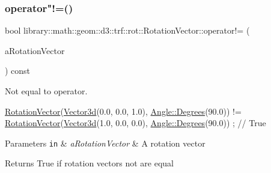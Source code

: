 \subsubsection{\texorpdfstring{operator"!=()}{operator!=()}}
{\footnotesize\ttfamily bool library\+::math\+::geom\+::d3\+::trf\+::rot\+::\+Rotation\+Vector\+::operator!= (\begin{DoxyParamCaption}\item[{const \hyperlink{classlibrary_1_1math_1_1geom_1_1d3_1_1trf_1_1rot_1_1_rotation_vector}{Rotation\+Vector} \&}]{a\+Rotation\+Vector }\end{DoxyParamCaption}) const}



Not equal to operator. 


\begin{DoxyCode}
\hyperlink{classlibrary_1_1math_1_1geom_1_1d3_1_1trf_1_1rot_1_1_rotation_vector_a49076a279f457fdb14c4a9d4d61e1738}{RotationVector}(\hyperlink{namespacelibrary_1_1math_1_1obj_a977e84e9bf317a4e7dd9d6d671d6da2f}{Vector3d}(0.0, 0.0, 1.0), \hyperlink{classlibrary_1_1math_1_1geom_1_1_angle_a64aa53e8420aeb6f671d86c65c370bc8}{Angle::Degrees}(90.0)) != 
      \hyperlink{classlibrary_1_1math_1_1geom_1_1d3_1_1trf_1_1rot_1_1_rotation_vector_a49076a279f457fdb14c4a9d4d61e1738}{RotationVector}(\hyperlink{namespacelibrary_1_1math_1_1obj_a977e84e9bf317a4e7dd9d6d671d6da2f}{Vector3d}(1.0, 0.0, 0.0), \hyperlink{classlibrary_1_1math_1_1geom_1_1_angle_a64aa53e8420aeb6f671d86c65c370bc8}{Angle::Degrees}(90.0)) ; \textcolor{comment}{// True}
\end{DoxyCode}



\begin{DoxyParams}[1]{Parameters}
\mbox{\tt in}  & {\em a\+Rotation\+Vector} & A rotation vector \\
\hline
\end{DoxyParams}
\begin{DoxyReturn}{Returns}
True if rotation vectors not are equal 
\end{DoxyReturn}
\mbox{\label{classlibrary_1_1math_1_1geom_1_1d3_1_1trf_1_1rot_1_1_rotation_vector_a3e56f843ce247d75d93a99defa47b386}} 
